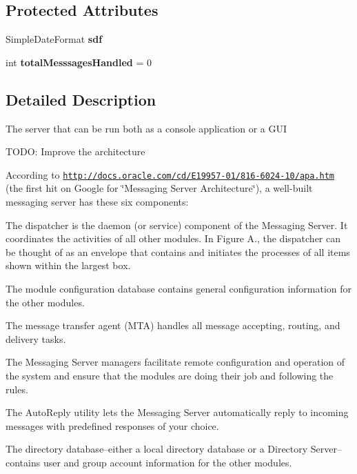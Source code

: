 \subsection*{Protected Attributes}
\begin{DoxyCompactItemize}
\item 
\hypertarget{classgov_1_1fnal_1_1ppd_1_1dd_1_1chat_1_1xml_1_1MessagingServer_a2038249b23a5ce9f47e61390fb5a1cb4}{Simple\-Date\-Format {\bfseries sdf}}\label{classgov_1_1fnal_1_1ppd_1_1dd_1_1chat_1_1xml_1_1MessagingServer_a2038249b23a5ce9f47e61390fb5a1cb4}

\item 
\hypertarget{classgov_1_1fnal_1_1ppd_1_1dd_1_1chat_1_1xml_1_1MessagingServer_ab074f0f7a5ba0d2f797e86a94c96c776}{int {\bfseries total\-Messsages\-Handled} = 0}\label{classgov_1_1fnal_1_1ppd_1_1dd_1_1chat_1_1xml_1_1MessagingServer_ab074f0f7a5ba0d2f797e86a94c96c776}

\end{DoxyCompactItemize}


\subsection{Detailed Description}
The server that can be run both as a console application or a G\-U\-I

T\-O\-D\-O\-: Improve the architecture

According to \href{http://docs.oracle.com/cd/E19957-01/816-6024-10/apa.htm}{\tt http\-://docs.\-oracle.\-com/cd/\-E19957-\/01/816-\/6024-\/10/apa.\-htm} (the first hit on Google for \char`\"{}\-Messaging Server Architecture\char`\"{}), a well-\/built messaging server has these six components\-: 
\begin{DoxyItemize}
\item The dispatcher is the daemon (or service) component of the Messaging Server. It coordinates the activities of all other modules. In Figure A., the dispatcher can be thought of as an envelope that contains and initiates the processes of all items shown within the largest box. 
\item The module configuration database contains general configuration information for the other modules. 
\item The message transfer agent (M\-T\-A) handles all message accepting, routing, and delivery tasks. 
\item The Messaging Server managers facilitate remote configuration and operation of the system and ensure that the modules are doing their job and following the rules. 
\item The Auto\-Reply utility lets the Messaging Server automatically reply to incoming messages with predefined responses of your choice. 
\item The directory database--either a local directory database or a Directory Server--contains user and group account information for the other modules. 
\end{DoxyItemize}

